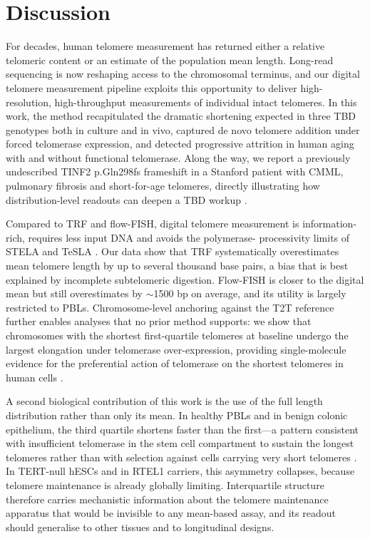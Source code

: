 \documentclass[11pt]{article}
\begin{document}
\section{Discussion}

For decades, human telomere measurement has returned either a relative
telomeric content or an estimate of the population mean length.
Long-read sequencing is now reshaping access to the chromosomal
terminus, and our digital telomere measurement pipeline exploits this
opportunity to deliver high-resolution, high-throughput measurements of
individual intact telomeres. In this work, the method recapitulated the
dramatic shortening expected in three TBD genotypes both in culture and
in vivo, captured de novo telomere addition under forced telomerase
expression, and detected progressive attrition in human aging with and
without functional telomerase. Along the way, we report a previously
undescribed TINF2 p.Gln298fs frameshift in a Stanford patient with
CMML, pulmonary fibrosis and short-for-age telomeres, directly
illustrating how distribution-level readouts can deepen a TBD workup
\citep{savage2008tinf2,alder2018diagnostic}.

Compared to TRF and flow-FISH, digital telomere measurement is
information-rich, requires less input DNA and avoids the polymerase-
processivity limits of STELA and TeSLA
\citep{baird2003extensive,lai2018comparison}. Our data show that TRF
systematically overestimates mean telomere length by up to several
thousand base pairs, a bias that is best explained by incomplete
subtelomeric digestion. Flow-FISH is closer to the digital mean but
still overestimates by $\sim$1500 bp on average, and its utility is
largely restricted to PBLs. Chromosome-level anchoring against the T2T
reference further enables analyses that no prior method supports: we
show that chromosomes with the shortest first-quartile telomeres at
baseline undergo the largest elongation under telomerase over-expression,
providing single-molecule evidence for the preferential action of
telomerase on the shortest telomeres in human cells
\citep{teixeira2004intertelomere,hemann2001shortest,britt2012preferential}.

A second biological contribution of this work is the use of the full
length distribution rather than only its mean. In healthy PBLs and in
benign colonic epithelium, the third quartile shortens faster than the
first---a pattern consistent with insufficient telomerase in the stem
cell compartment to sustain the longest telomeres rather than with
selection against cells carrying very short telomeres
\citep{britt2012preferential}. In TERT-null hESCs and in RTEL1 carriers,
this asymmetry collapses, because telomere maintenance is already
globally limiting. Interquartile structure therefore carries
mechanistic information about the telomere maintenance apparatus that
would be invisible to any mean-based assay, and its readout should
generalise to other tissues and to longitudinal designs.
\end{document}
